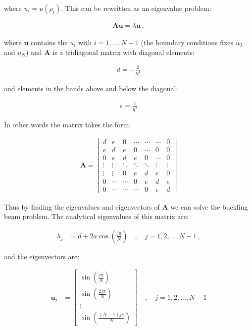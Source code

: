 \documentclass[reprint,english,notitlepage]{revtex4-1}  %
\begin{document}
where $u_i = u(\rho_i)$. This can be rewritten as an eigenvalue problem:

\begin{align*}
\textbf{Au} = \lambda \textbf{u} \, ,
\end{align*}

where $\textbf{u}$ contains the $u_i$ with $i = 1,...,N-1$ (the boundary conditions fixes $u_0$ and $u_N$) and $\textbf{A}$ is a tridiagonal matrix with diagonal elements:

\begin{align*}
d = -\frac{2}{h^2}
\end{align*}

and elements in the bands above and below the diagonal:

\begin{align*}
e = \frac{1}{h^2}
\end{align*}

In other words the matrix takes the form:

\begin{align*}
\textbf{A} = \begin{bmatrix}
d & e & 0 & \cdots  & \cdots & \cdots & 0  \\
e & d & e & 0 & \cdots & 0 & 0 \\
0 & e & d & e & 0 & \cdots & 0 \\
\vdots & \vdots & \ddots & \ddots & \ddots & \vdots &  \vdots \\
\vdots & \vdots & 0 & e & d & e & 0 \\
0 & \cdots & \cdots & 0 & e & d & e \\
0 & \cdots & \cdots & \cdots & 0 & e & d
\end{bmatrix}
\end{align*}

Thus by finding the eigenvalues and eigenvectors of $\textbf{A}$ we can solve the buckling beam problem. The analytical eigenvalues of this matrix are:

\begin{align*}
\lambda_j &= d + 2a \cos ( \frac{j\pi}{N}) \quad , \quad j = 1,2,...,N-1 \, ,
\end{align*}

and the eigenvectors are:

\begin{align*}
\textbf{u}_j &= \begin{bmatrix}
\sin( \frac{j\pi}{N} ) \\
\sin( \frac{2j\pi}{N} ) \\
\vdots \\
\sin( \frac{(N-1)j\pi}{N} )
\end{bmatrix} \quad , \quad j = 1,2,...,N-1
\end{align*}
\end{document}
